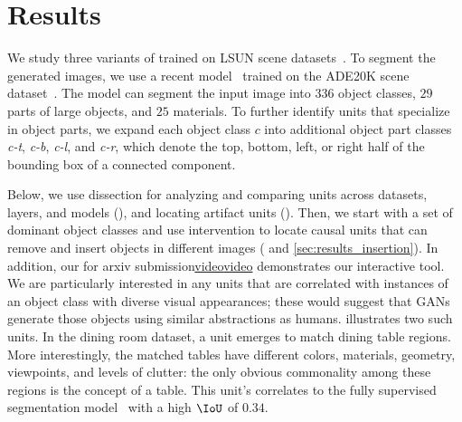 \documentclass{article} %
\def\arxiv{for arxiv submission}
\begin{document}
\section{Results}
We study three variants of \pgan\citep{karras2018progressive} trained on LSUN scene datasets~\citep{yu2015lsun}. To segment the generated images, we use a recent model~\citep{xiao2018unified} trained on the ADE20K scene dataset~\citep{zhou2017scene}. The model can segment the input image into $336$ object classes, $29$  parts of large objects, and $25$ materials.
To further identify units that specialize in object parts, we expand each object class $c$  into additional object part classes \textit{c-t}, \textit{c-b}, \textit{c-l}, and \textit{c-r}, which denote the top, bottom, left, or right half of the bounding box of a connected component.

Below, we use dissection for analyzing and comparing units across datasets, layers, and models (), and locating artifact units (). Then, we start with a set of dominant object classes and use intervention to locate causal units that can remove and insert objects in different images ( and \ref{sec:results_insertion}). In addition, our
\ifdefined\arxiv\href{http://tiny.cc/gandissect}{video}\else\href{http://tiny.cc/iclrganvis}{video}\fi
demonstrates our interactive tool. %
We are particularly interested in any units that are correlated with instances of an object class with diverse visual appearances; these would suggest that GANs generate those objects using similar abstractions as humans.   illustrates two such units.  In the dining room dataset, a unit emerges to match dining table regions. More interestingly, the matched tables have different colors, materials, geometry, viewpoints, and levels of clutter: the only obvious commonality among these regions is the concept of a table. %
This unit's \featuremap correlates to the fully supervised segmentation model~\citep{xiao2018unified} with a high $\IoU$ of $0.34$.
\end{document}
